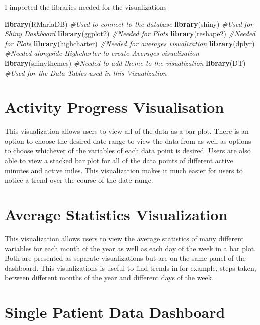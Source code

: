 \documentclass[]{book}
\newenvironment{Shaded}{\begin{snugshade}}{\end{snugshade}}
\newcommand{\KeywordTok}[1]{\textcolor[rgb]{0.13,0.29,0.53}{\textbf{#1}}}
\newcommand{\CommentTok}[1]{\textcolor[rgb]{0.56,0.35,0.01}{\textit{#1}}}
\newcommand{\NormalTok}[1]{#1}
\begin{document}
I imported the libraries needed for the visualizations

\begin{Shaded}
\begin{Highlighting}[]
\KeywordTok{library}\NormalTok{(RMariaDB) }\CommentTok{#Used to connect to the database}
\KeywordTok{library}\NormalTok{(shiny) }\CommentTok{#Used for Shiny Dashboard}
\KeywordTok{library}\NormalTok{(ggplot2) }\CommentTok{#Needed for Plots}
\KeywordTok{library}\NormalTok{(reshape2) }\CommentTok{#Needed for Plots}
\KeywordTok{library}\NormalTok{(highcharter) }\CommentTok{#Needed for averages visualization}
\KeywordTok{library}\NormalTok{(dplyr) }\CommentTok{#Needed alongside Highcharter to create Averages visualization}
\KeywordTok{library}\NormalTok{(shinythemes) }\CommentTok{#Needed to add theme to the visualization}
\KeywordTok{library}\NormalTok{(DT) }\CommentTok{#Used for the Data Tables used in this Vizualization}
\end{Highlighting}
\end{Shaded}

\section{Activity Progress
Visualisation}\label{activity-progress-visualisation}

This visualization allows users to view all of the data as a bar plot.
There is an option to choose the desired date range to view the data
from as well as options to choose whichever of the variables of each
data point is desired. Users are also able to view a stacked bar plot
for all of the data points of different active minutes and active miles.
This visualization makes it much easier for users to notice a trend over
the course of the date range.

\section{Average Statistics
Visualization}\label{average-statistics-visualization}

This visualization allows users to view the average statistics of many
different variables for each month of the year as well as each day of
the week in a bar plot. Both are presented as separate visualizations
but are on the same panel of the dashboard. This visualizations is
useful to find trends in for example, steps taken, between different
months of the year and different days of the week.

\section{Single Patient Data
Dashboard}\label{single-patient-data-dashboard}
\end{document}
